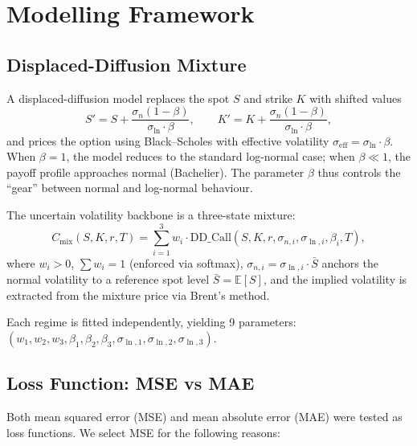 \documentclass[12pt]{article}
\begin{document}
\section{Modelling Framework}
\label{sec:model}

\subsection{Displaced-Diffusion Mixture}

A displaced-diffusion model replaces the spot $S$ and strike $K$ with shifted values
\begin{equation}
  S' = S + \frac{\sigma_n(1-\beta)}{\sigma_{\ln} \cdot \beta}, \qquad
  K' = K + \frac{\sigma_n(1-\beta)}{\sigma_{\ln} \cdot \beta},
\end{equation}
and prices the option using Black--Scholes with effective volatility $\sigma_{\text{eff}} = \sigma_{\ln} \cdot \beta$. When $\beta = 1$, the model reduces to the standard log-normal case; when $\beta \ll 1$, the payoff profile approaches normal (Bachelier). The parameter $\beta$ thus controls the ``gear'' between normal and log-normal behaviour.

The uncertain volatility backbone is a three-state mixture:
\begin{equation}
  C_{\text{mix}}(S, K, r, T) = \sum_{i=1}^{3} w_i \cdot \mathrm{DD\_Call}(S, K, r, \sigma_{n,i}, \sigma_{\ln,i}, \beta_i, T),
\end{equation}
where $w_i > 0$, $\sum w_i = 1$ (enforced via softmax), $\sigma_{n,i} = \sigma_{\ln,i} \cdot \bar{S}$ anchors the normal volatility to a reference spot level $\bar{S} = \mathbb{E}[S]$, and the implied volatility is extracted from the mixture price via Brent's method.

Each regime is fitted independently, yielding 9 parameters: $(w_1, w_2, w_3, \beta_1, \beta_2, \beta_3, \sigma_{\ln,1}, \sigma_{\ln,2}, \sigma_{\ln,3})$.

\subsection{Loss Function: MSE vs MAE}
\label{sec:mse}

Both mean squared error (MSE) and mean absolute error (MAE) were tested as loss functions. We select MSE for the following reasons:
\end{document}
